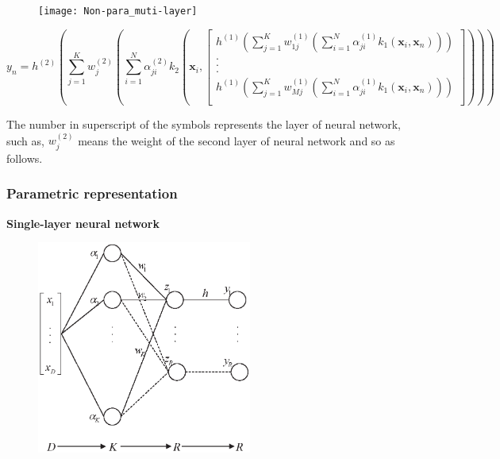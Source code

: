 \documentclass{article}
\begin{document}
\begin{figure}[h]
\centering
\texttt{[image: Non-para\_muti-layer]}
\end{figure}

\begin{equation}
y_n = h^{(2)} \left( \sum\limits_{j=1}^{K} w_{j}^{(2)} \left( \sum\limits_{i=1}^{N} \alpha_{ji}^{(2)} k_2( \mathbf{x}_{i},\left[               
  \begin{array}{c}   
    h^{(1)} \left( \sum\limits_{j=1}^{K} w_{1j}^{(1)} \left( \sum\limits_{i=1}^{N} \alpha_{ji}^{(1)}k_1( \mathbf{x}_{i},\mathbf{x}_n) \right) \right)\\  
    .\\  
    .\\  
    .\\
    h^{(1)} \left( \sum\limits_{j=1}^{K} w_{Mj}^{(1)} \left( \sum\limits_{i=1}^{N} \alpha_{ji}^{(1)}k_1( \mathbf{x}_{i},\mathbf{x}_n) \right) \right)\\
  \end{array}
\right] )
 \right) \right)
\end{equation} 

\par The number in superscript of the symbols represents the layer of neural network, such as, $w_j^{(2)}$ means the weight of the second layer of neural network and so as follows. \\



\subsubsection{Parametric representation}


\par \textbf{Single-layer neural network}\\

\begin{figure}[h]
\centering
\includegraphics[height=7cm]{Para_single-layer}
\end{figure}
\end{document}
